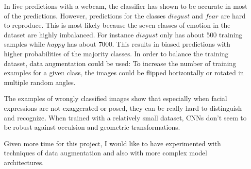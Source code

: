 \documentclass[twoside]{article}
\begin{document}
\begin{multicols}{2}
In live predictions with a webcam, the classifier has shown to be accurate in most of the predictions. However, predictions for the classes $disgust$ and $fear$ are hard to reproduce. This is most likely because the seven classes of emotion in the dataset are highly imbalanced. For instance $disgust$ only has about 500 training samples while $happy$ has about 7000. This results in biased predictions with higher probabilities of the majority classes. In order to balance the training dataset, data augmentation \cite{krizhevsky12} could be used: To increase the number of training examples for a given class, the images could be flipped horizontally or rotated in multiple random angles. 

The examples of wrongly classified images show that especially when facial expressions are not exaggerated or posed, they can be really hard to distinguish and recognize. When trained with a relatively small dataset, CNNs don't seem to be robust against occulsion and geometric transformations.

Given more time for this project, I would like to have experimented with techniques of data augmentation and also with more complex model architectures.









\end{multicols}
\end{document}
